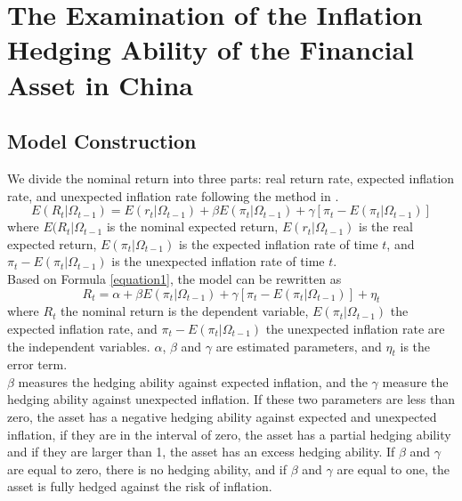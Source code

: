 \documentclass[12pt]{article}
\begin{document}
\section{The Examination of the Inflation Hedging Ability of the Financial Asset in China}
\subsection{Model Construction}
We divide the nominal return into three parts: real return rate, expected inflation rate, and unexpected inflation rate following the method in \citep{yu2015study}.\\
\begin{equation}
E(R_{t}|\Omega_{t-1})=E(r_{t}|\Omega_{t-1})+\beta E(\pi_{t}|\Omega_{t-1})+\gamma \left [\pi_{t}-E(\pi_{t}|\Omega_{t-1})  \right ] \label{equation1}
\end{equation}
where $E(R_{t}|\Omega_{t-1}$ is the nominal expected return, $E(r_{t}|\Omega_{t-1})$ is the real expected return, $E(\pi_{t}|\Omega_{t-1})$ is the expected inflation rate of time $t$, and $\pi_{t}-E(\pi_{t}|\Omega_{t-1})$ is the unexpected inflation rate of time $t$.\\
Based on Formula \eqref{equation1}, the model can be rewritten as
\begin{equation}
R_{t}=\alpha +\beta E(\pi_{t}|\Omega_{t-1})+\gamma \left [\pi_{t}-E(\pi_{t}|\Omega_{t-1})  \right ]+\eta _{t}
\label{equation2}
\end{equation}
where $R_{t}$ the nominal return is the dependent variable, $E(\pi_{t}|\Omega_{t-1})$ the expected inflation rate, and $\pi_{t}-E(\pi_{t}|\Omega_{t-1})$ the unexpected inflation rate are the independent variables. $\alpha$, $\beta$ and $\gamma$ are estimated parameters, and $\eta _{t}$ is the error term.\\
$\beta$ measures the hedging ability against expected inflation, and the $\gamma$ measure the hedging ability against unexpected inflation. If these two parameters are less than zero, the asset has a negative hedging ability against expected and unexpected inflation, if they are in the interval of zero, the asset has a partial hedging ability and if they are larger than 1, the asset has an excess hedging ability. If $\beta$ and $\gamma$ are equal to zero, there is no hedging ability, and if $\beta$ and $\gamma$ are equal to one, the asset is fully hedged against the risk of inflation.\\
\end{document}
